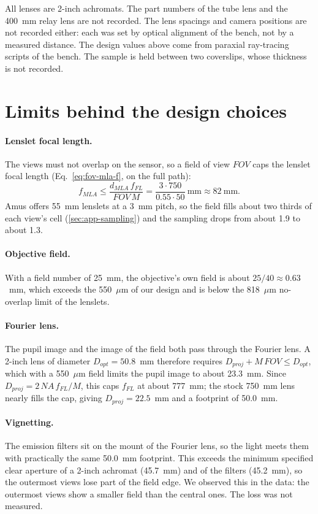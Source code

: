 All lenses are 2-inch achromats. The part numbers of the tube lens and the 400~mm relay lens are not recorded. The lens spacings and camera positions are not recorded either: each was set by optical alignment of the bench, not by a measured distance. The design values above come from paraxial ray-tracing scripts of the bench. The sample is held between two coverslips, whose thickness is not recorded.

\section{Limits behind the design choices}
\label{sec:app-design-limits}

\paragraph{Lenslet focal length.} The views must not overlap on the sensor, so a field of view $FOV$ caps the lenslet focal length (Eq.~\eqref{eq:fov-mla-f}, on the full path):
\begin{equation}
    f_{MLA} \le \frac{d_{MLA}\,f_{FL}}{FOV\,M} = \frac{3\cdot750}{0.55\cdot50}\ \mathrm{mm} \approx 82~\mathrm{mm}.
    \label{eq:app-fmla-cap}
\end{equation}
Amus offers 55~mm lenslets at a 3~mm pitch, so the field fills about two thirds of each view's cell (\cref{sec:app-sampling}) and the sampling drops from about 1.9 to about 1.3.

\paragraph{Objective field.} With a field number of 25~mm, the objective's own field is about $25/40\approx0.63$~mm, which exceeds the 550~$\mu$m of our design and is below the 818~$\mu$m no-overlap limit of the lenslets.

\paragraph{Fourier lens.} The pupil image and the image of the field both pass through the Fourier lens. A 2-inch lens of diameter $D_{opt}=50.8$~mm therefore requires $D_{proj}+M\,FOV\le D_{opt}$, which with a 550~$\mu$m field limits the pupil image to about 23.3~mm. Since $D_{proj}=2\,NA\,f_{FL}/M$, this caps $f_{FL}$ at about 777~mm; the stock 750~mm lens nearly fills the cap, giving $D_{proj}=22.5$~mm and a footprint of 50.0~mm.

\paragraph{Vignetting.} The emission filters sit on the mount of the Fourier lens, so the light meets them with practically the same 50.0~mm footprint. This exceeds the minimum specified clear aperture of a 2-inch achromat (45.7~mm) and of the filters (45.2~mm), so the outermost views lose part of the field edge. We observed this in the data: the outermost views show a smaller field than the central ones. The loss was not measured.

